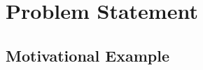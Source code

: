 \section{Problem Statement}\label{sec:problem_statement}


\begin{frame}{\secname}
	\lipsum[1-1]
\end{frame}


\subsection[ ]{Motivational Example}\label{subsec:motivational_example}

\begin{frame}{\secname}
	\framesubtitle{\subsecname}
	\lipsum[1-1]
\end{frame}